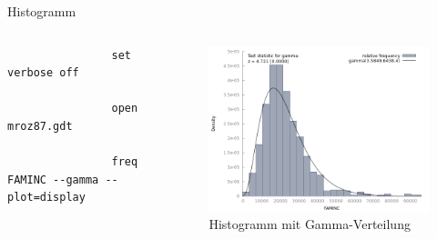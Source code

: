 \documentclass{beamer}[11pt]
\begin{document}
\begin{frame}[fragile]{Histogramm}
	\begin{columns}[T] %
		\scriptsize
		\begin{column}{.45\textwidth}
			\begin{verbatim}
				set verbose off

				open mroz87.gdt

				freq FAMINC --gamma --plot=display
			\end{verbatim}
		\end{column}

		\begin{column}{.55\textwidth}
			\begin{figure}
				\includegraphics[width=1.0\textwidth]{../figures/freq_gamma.png}
				\caption{Histogramm mit Gamma-Verteilung}
			\end{figure}
	  \end{column}
	\end{columns}
\end{frame}
\end{document}
